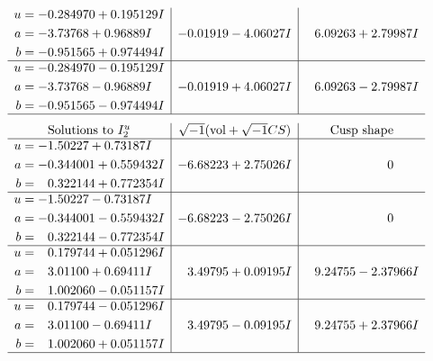 \documentclass[1p]{elsarticle_modified}
\theoremstyle{definition}
\newcommand{\I}{\sqrt{-1}}
\begin{document}
$$\begin{array}{c|c|c}
\begin{aligned}
u &= -0.284970 + 0.195129 I \\
a &= -3.73768 + 0.96889 I \\
b &= -0.951565 + 0.974494 I\end{aligned}
 & -0.01919 - 4.06027 I & \phantom{-}6.09263 + 2.79987 I \\ \hline\begin{aligned}
u &= -0.284970 - 0.195129 I \\
a &= -3.73768 - 0.96889 I \\
b &= -0.951565 - 0.974494 I\end{aligned}
 & -0.01919 + 4.06027 I & \phantom{-}6.09263 - 2.79987 I\\
 \hline 
 \end{array}$$\newpage$$\begin{array}{c|c|c}  
\text{Solutions to }I^u_{2}& \I (\text{vol} + \sqrt{-1}CS) & \text{Cusp shape}\\
 \hline 
\begin{aligned}
u &= -1.50227 + 0.73187 I \\
a &= -0.344001 + 0.559432 I \\
b &= \phantom{-}0.322144 + 0.772354 I\end{aligned}
 & -6.68223 + 2.75026 I & \phantom{-0.000000 } 0 \\ \hline\begin{aligned}
u &= -1.50227 - 0.73187 I \\
a &= -0.344001 - 0.559432 I \\
b &= \phantom{-}0.322144 - 0.772354 I\end{aligned}
 & -6.68223 - 2.75026 I & \phantom{-0.000000 } 0 \\ \hline\begin{aligned}
u &= \phantom{-}0.179744 + 0.051296 I \\
a &= \phantom{-}3.01100 + 0.69411 I \\
b &= \phantom{-}1.002060 - 0.051157 I\end{aligned}
 & \phantom{-}3.49795 + 0.09195 I & \phantom{-}9.24755 - 2.37966 I \\ \hline\begin{aligned}
u &= \phantom{-}0.179744 - 0.051296 I \\
a &= \phantom{-}3.01100 - 0.69411 I \\
b &= \phantom{-}1.002060 + 0.051157 I\end{aligned}
 & \phantom{-}3.49795 - 0.09195 I & \phantom{-}9.24755 + 2.37966 I\\
 \hline 
 \end{array}$$\newpage
\end{document}
